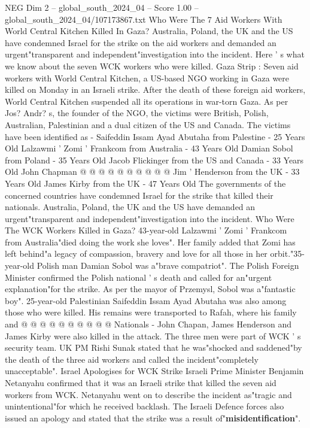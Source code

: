 \begin{textsample}{NEG Dim 2 – global\_south\_2024\_04 – Score 1.00 – global\_south\_2024\_04/107173867.txt}  \label{ex:f2_neg_399}
Who Were The 7 Aid Workers With World Central Kitchen Killed In Gaza?
Australia, Poland, the UK and the US have condemned Israel for the strike on the aid workers and demanded an urgent"transparent and independent"investigation into the incident.
Here ' s what we know about the seven WCK workers who were killed.
Gaza Strip : Seven aid workers with World Central Kitchen, a US-based NGO working in Gaza were killed on Monday in an Israeli strike.
After the death of these foreign aid workers, World Central Kitchen suspended all its operations in war-torn Gaza.
As per Jos?
Andr? s, the founder of the NGO, the victims were British, Polish, Australian, Palestinian and a dual citizen of the US and Canada.
The victims have been identified as - Saifeddin Issam Ayad Abutaha from Palestine - 25 Years Old Lalzawmi ' Zomi ' Frankcom from Australia - 43 Years Old Damian Sobol from Poland - 35 Years Old Jacob Flickinger from the US and Canada - 33 Years Old John Chapman @ @ @ @ @ @ @ @ @ @ Jim ' Henderson from the UK - 33 Years Old James Kirby from the UK - 47 Years Old The governments of the concerned countries have condemned Israel for the strike that killed their nationals.
Australia, Poland, the UK and the US have demanded an urgent"transparent and independent"investigation into the incident.
Who Were The WCK Workers Killed in Gaza? 43-year-old Lalzawmi ' Zomi ' Frankcom from Australia"died doing the work she loves".
Her family added that Zomi has left behind"a legacy of compassion, bravery and love for all those in her orbit."35-year-old Polish man Damian Sobol was a"brave compatriot".
The Polish Foreign Minister confirmed the Polish national ' s death and called for an"urgent explanation"for the strike.
As per the mayor of Przemysl, Sobol was a"fantastic boy". 25-year-old Palestinian Saifeddin Issam Ayad Abutaha was also among those who were killed.
His remains were transported to Rafah, where his family and @ @ @ @ @ @ @ @ @ @ Nationals - John Chapan, James Henderson and James Kirby were also killed in the attack.
The three men were part of WCK ' s security team.
UK PM Rishi Sunak stated that he was"shocked and saddened"by the death of the three aid workers and called the incident"completely unacceptable".
Israel Apologises for WCK Strike Israeli Prime Minister Benjamin Netanyahu confirmed that it was an Israeli strike that killed the seven aid workers from WCK.
Netanyahu went on to describe the incident as"tragic and unintentional"for which he received backlash.
The Israeli Defence forces also issued an apology and stated that the strike was a result of"\textbf{misidentification}".

\end{textsample}
